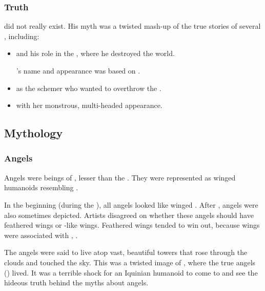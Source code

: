 \subsubsection{Truth}
\Isphet did not really exist. 
His myth was a twisted mash-up of the true stories of several \dragons, including: 
\begin{itemize}
  \item 
     and his role in the , where he  destroyed the world.
    
    \Isphet's name and appearance was based on \Ishnaruchaefir. 
  \item 
     as the schemer who wanted to overthrow the \sephiroth. 
  \item 
     with her monstrous, multi-headed appearance. 
\end{itemize}









\subsection{Mythology}





\subsubsection{Angels}
Angels were beings of \iquin, lesser than the \sephiroth. 
They were represented as winged humanoids resembling \resphain. 

In the beginning (during the \caliphate), all angels looked like winged \humans. 
After , \scathaese angels were also sometimes depicted. 
Artists disagreed on whether these angels should have feathered wings or -like wings. 
Feathered wings tended to win out, because \pteran wings were associated with \dragons, . 

The angels were said to live atop vast, beautiful towers that rose through the clouds and touched the sky. 
This was a twisted image of , where the true angels (\resphain) lived. 
It was a terrible shock for an Iquinian humanoid to come to \Nyx and see the hideous truth behind the myths about angels. 





